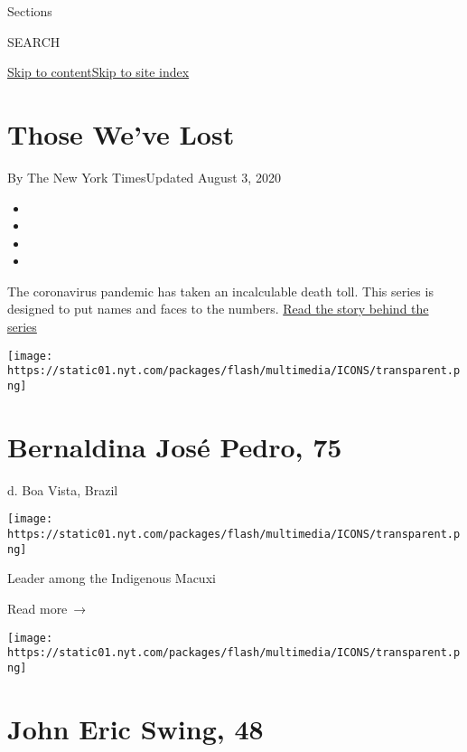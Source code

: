 Sections

SEARCH

\protect\hyperlink{site-content}{Skip to
content}\protect\hyperlink{site-index}{Skip to site index}

\hypertarget{those-weve-lost}{%
\section{Those We've Lost}\label{those-weve-lost}}

By The New York TimesUpdated August 3, 2020

\begin{itemize}
\item
\item
\item
\item
\end{itemize}

The coronavirus pandemic has taken an incalculable death toll. This
series is designed to put names and faces to the numbers.
\href{https://www.nytimes.com/2020/04/16/reader-center/coronavirus-obits.html}{Read
the story behind the series}

\href{https://www.nytimes.com/2020/08/03/obituaries/bernaldina-jose-pedro-dead-coronavirus.html}{}

\texttt{[image: https://static01.nyt.com/packages/flash/multimedia/ICONS/transparent.png]}

\hypertarget{bernaldina-josuxe9-pedro-75}{%
\section{Bernaldina José Pedro, 75}\label{bernaldina-josuxe9-pedro-75}}

d. Boa Vista, Brazil

\texttt{[image: https://static01.nyt.com/packages/flash/multimedia/ICONS/transparent.png]}

Leader among the Indigenous Macuxi

 Read more~→

\href{https://www.nytimes.com/2020/08/03/obituaries/john-swing-dead-coronavirus.html}{}

\texttt{[image: https://static01.nyt.com/packages/flash/multimedia/ICONS/transparent.png]}

\hypertarget{john-eric-swing-48}{%
\section{John Eric Swing, 48}\label{john-eric-swing-48}}

